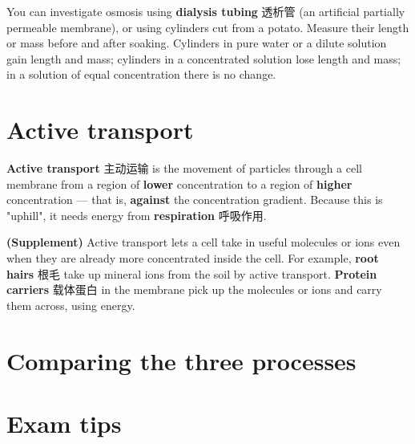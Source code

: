 \documentclass[11pt]{article}
\begin{document}
You can investigate osmosis using \textbf{dialysis tubing} 透析管 (an artificial partially permeable membrane), or using cylinders cut from a potato. Measure their length or mass before and after soaking. Cylinders in pure water or a dilute solution gain length and mass; cylinders in a concentrated solution lose length and mass; in a solution of equal concentration there is no change.

\section*{Active transport}

\textbf{Active transport} 主动运输 is the movement of particles through a cell membrane from a region of \textbf{lower} concentration to a region of \textbf{higher} concentration — that is, \textbf{against} the concentration gradient. Because this is "uphill", it needs energy from \textbf{respiration} 呼吸作用.

\textbf{(Supplement)} Active transport lets a cell take in useful molecules or ions even when they are already more concentrated inside the cell. For example, \textbf{root hairs} 根毛 take up mineral ions from the soil by active transport. \textbf{Protein carriers} 载体蛋白 in the membrane pick up the molecules or ions and carry them across, using energy.

\section*{Comparing the three processes}

\begin{center}
\end{center}

\section*{Exam tips}
\end{document}
